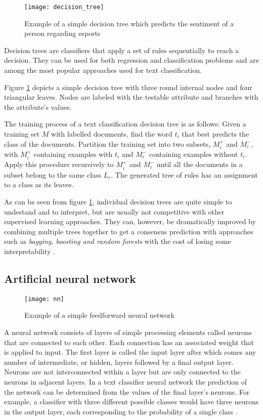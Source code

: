 \begin{figure}[t]
\texttt{[image: decision\_tree]}
\centering
\caption{Example of a simple decision tree which predicts the sentiment of a person regarding esports}
\label{fig:decision_tree}
\end{figure}
Decision trees are classifiers that apply a set of rules sequentially to reach a decision. They can be used for both regression and classification problems and are among the most popular approaches used for text classification.
\cite{hotho} \cite{rokach2005}

Figure \ref{fig:decision_tree} depicts a simple decision tree with three round internal nodes and four triangular leaves. Nodes are labeled with the testable attribute and branches with the attribute's values.

The training process of a text classification decision tree is as follows: Given a training set $M$ with labelled documents, find the word $t_i$ that best predicts the class of the documents. Partition the training set into two subsets, $M^+_i$ and $M^-_i$, with $M^+_i$ containing examples with $t_i$ and $M^-_i$ containing examples without $t_i$. Apply this procedure recursively to $M^+_i$ and $M^-_i$ until all the documents in a subset belong to the same class $L_c$. The generated tree of rules has an assignment to a class as its leaves.
\cite{hotho}


As can be seen from figure \ref{fig:decision_tree}, individual decision trees are quite simple to undestand and to interpret, but are usually not competitive with other supervised learning approaches. They can, however, be dramatically improved by combining multiple trees together to get a consensus prediction with approaches such as \textit{bagging, boosting and random forests} with the cost of losing some interpretability \cite{james2013}.

\subsection{Artificial neural network} \label{Artificial neural network}
\begin{figure}[t]
\texttt{[image: nn]}
\centering
\caption{Example of a simple feedforward neural network}
\label{fig:nn}
\end{figure}

A neural network consists of layers of simple processing elements called neurons that are connected to each other.
Each connection has an associated weight that is applied to input.
The first layer is called the input layer after which comes any number of intermediate, or hidden, layers followed by a final output layer.
Neurons are not interconnected within a layer but are only connected to the neurons in adjacent layers.
In a text classifier neural network the prediction of the network can be determined from the values of the final layer's neurons.
For example, a classifier with three different possible classes would have three neurons in the output layer, each corresponding to the probability of a single class \cite{pal1992}.


